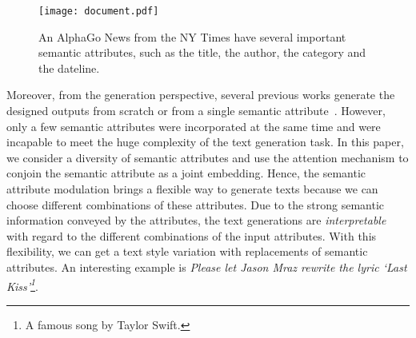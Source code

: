 \documentclass[a4paper]{article}
\begin{document}
\begin{figure}[t]\centering
    {
    \texttt{[image: document.pdf]}
    }
    \vspace{-.3cm}
    \caption{An AlphaGo News from the NY Times have several important semantic attributes, such as the title, the author, the category and the dateline.}
    \vspace{-.3cm}
    \label{fig:document modality}
\end{figure}

Moreover, from the generation perspective, several previous works generate the designed outputs from scratch or from a single semantic attribute~\cite{lipton2015capturing,sennrich2016controlling,pavlick2016empirical,lebret2016neural,kiddon2016globally,radford2017learning,hu2017toward}. However, only a few semantic attributes were incorporated at the same time and were incapable to meet the huge complexity of the text generation task.
In this paper, we consider a diversity of semantic attributes and use the attention mechanism to conjoin the semantic attribute as a joint embedding.
Hence, the semantic attribute modulation brings a flexible way to generate texts because we can choose different combinations of these attributes. Due to the strong semantic information conveyed by the attributes, the text generations are \emph{interpretable} with regard to the different combinations of the input attributes.
With this flexibility, we can get a text style variation with replacements of semantic attributes. An interesting example is \emph{Please let Jason Mraz rewrite the lyric `Last Kiss'\footnote{A famous song by Taylor Swift.}}.





\end{document}
